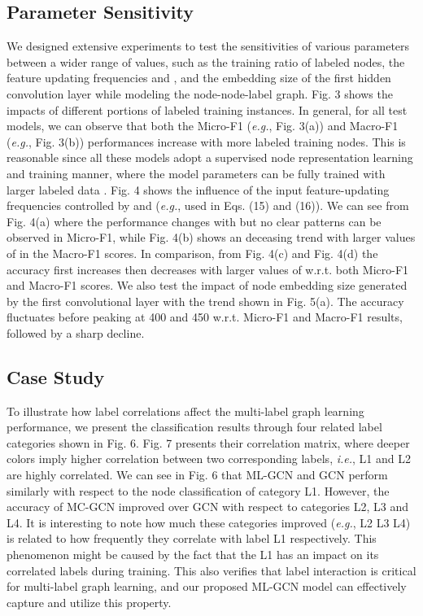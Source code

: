 \documentclass[conference]{IEEEtran}
\begin{document}
\subsection{Parameter Sensitivity}
We designed extensive experiments to test the sensitivities of various parameters between a wider range of values, such as the training ratio  of labeled nodes, the feature updating frequencies  and , and the embedding size of the first hidden convolution layer while modeling the node-node-label graph. Fig. 3 shows the impacts of different portions of labeled training instances. In general, for all test models, we can observe that both the Micro-F1 (\textit{e.g.}, Fig. 3(a)) and Macro-F1 (\textit{e.g.}, Fig. 3(b)) performances increase with more labeled training nodes. This is reasonable since all these models adopt a supervised node representation learning and training manner, where the model parameters can be fully trained with larger labeled data \cite{25}. Fig. 4 shows the influence of the input feature-updating frequencies  controlled by  and  (\textit{e.g.}, used in Eqs. (15) and (16)). We can see from Fig. 4(a) where the performance changes with  but no clear patterns can be observed in Micro-F1, while Fig. 4(b) shows an deceasing trend with larger values of  in the Macro-F1 scores. In comparison, from Fig. 4(c) and Fig. 4(d) the accuracy first increases then decreases with larger values of  w.r.t. both Micro-F1 and Macro-F1 scores. We also test the impact of node embedding size generated by the first convolutional layer with the trend shown in Fig. 5(a). The accuracy fluctuates before peaking at 400 and 450 w.r.t. Micro-F1 and Macro-F1 results, followed by a sharp decline.

\subsection{Case Study}
To illustrate how label correlations affect the multi-label graph learning performance, we present the classification results through four related label categories shown in Fig. 6. Fig. 7 presents their correlation matrix, where deeper colors imply higher correlation between two corresponding labels, \textit{i.e.}, L1 and L2 are highly correlated. We can see in Fig. 6 that ML-GCN and GCN perform similarly with respect to the node classification of category L1. However, the accuracy of MC-GCN improved over GCN with respect to categories L2, L3 and L4. It is interesting to note how much these categories improved (\textit{e.g.}, L2  L3  L4) is related to how frequently they correlate with label L1 respectively. This phenomenon might be caused by the fact that the L1 has an impact on its correlated labels during training. This also verifies that label interaction is critical for multi-label graph learning, and our proposed ML-GCN model can effectively capture and utilize this property.
\end{document}
